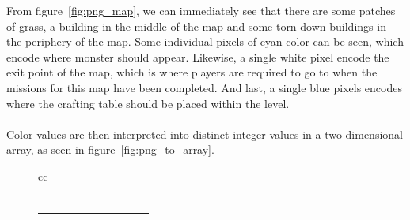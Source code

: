 From figure~\ref{fig:png_map}, we can immediately see that there are some
patches of grass, a building in the middle of the map and some torn-down
buildings in the periphery of the map. Some individual pixels of cyan color can
be seen, which encode where monster should appear. Likewise, a single white
pixel encode the exit point of the map, which is where players are required to
go to when the missions for this map have been completed. And last, a single
blue pixels encodes where the crafting table should be placed within the level.
\\
\\
Color values are then interpreted into distinct integer values in a
two-dimensional array, as seen in figure~\ref{fig:png_to_array}.
\begin{figure}[H]
    \centering
    \begin{tabular}{cc}
        {\footnotesize
            \setlength{\tabcolsep}{4.5pt}
            \begin{tabular}{|c|c|c|c|c|c|c|c|c|c|}
                \hline
                \cellcolor{black} & \cellcolor{black} & \cellcolor{black} &
                \cellcolor{black} & \cellcolor{black} & \cellcolor{red} &
                \cellcolor{red} & \cellcolor{red} & \cellcolor{red} &
                \cellcolor{red} \\ \hline
                \cellcolor{green} & \cellcolor{green} & \cellcolor{black} &
                \cellcolor{black} & \cellcolor{black} & \cellcolor{yellow} &
                \cellcolor{red} & \cellcolor{red} & \cellcolor{red} &
                \cellcolor{red} \\ \hline
                \cellcolor{green} & \cellcolor{green} & \cellcolor{green} &
                \cellcolor{black} & \cellcolor{black} & \cellcolor{yellow} &
                \cellcolor{red} & \cellcolor{red} & \cellcolor{red} &
                \cellcolor{red} \\ \hline
                \cellcolor{green} & \cellcolor{green} & \cellcolor{green} &
                \cellcolor{black} & \cellcolor{black} & \cellcolor{yellow} &
                \cellcolor{red} & \cellcolor{red} & \cellcolor{red} &
                \cellcolor{red} \\ \hline
                \cellcolor{green} & \cellcolor{green} & \cellcolor{green} &
                \cellcolor{black} & \cellcolor{black} & \cellcolor{yellow} &
                \cellcolor{yellow} & \cellcolor{red} & \cellcolor{red} &
                \cellcolor{yellow} \\ \hline

\end{tabular}}
\end{tabular}
\end{figure}
